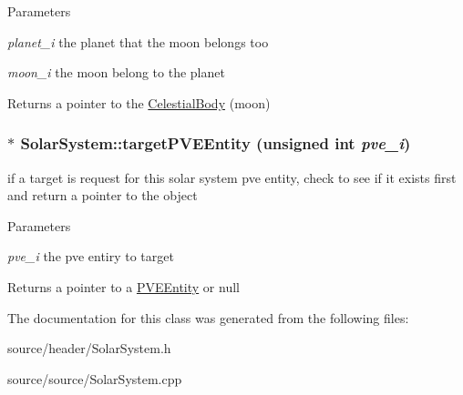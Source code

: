 \begin{DoxyParams}{Parameters}
\item[{\em planet\_\-i}]the planet that the moon belongs too \item[{\em moon\_\-i}]the moon belong to the planet\end{DoxyParams}
\begin{DoxyReturn}{Returns}
a pointer to the \hyperlink{classCelestialBody}{CelestialBody} (moon) 
\end{DoxyReturn}
\hypertarget{classSolarSystem_a92a2a0ae9e987e32e65c46d207a868d7}{
\subsubsection[{targetPVEEntity}]{ $\ast$ SolarSystem::targetPVEEntity (unsigned int {\em pve\_\-i})}}
\label{df/d5e/classSolarSystem_a92a2a0ae9e987e32e65c46d207a868d7}
if a target is request for this solar system pve entity, check to see if it exists first and return a pointer to the object


\begin{DoxyParams}{Parameters}
\item[{\em pve\_\-i}]the pve entiry to target\end{DoxyParams}
\begin{DoxyReturn}{Returns}
a pointer to a \hyperlink{classPVEEntity}{PVEEntity} or null 
\end{DoxyReturn}


The documentation for this class was generated from the following files:\begin{DoxyCompactItemize}
\item 
source/header/SolarSystem.h\item 
source/source/SolarSystem.cpp\end{DoxyCompactItemize}
